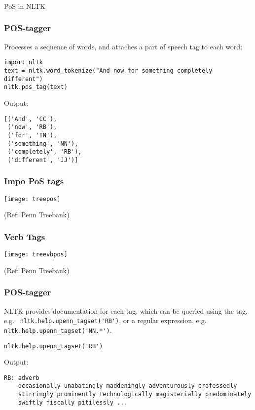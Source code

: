 \begin{frame}[fragile]\frametitle{}

\begin{center}
{\Large PoS in NLTK}
\end{center}
\end{frame}

\begin{frame}[fragile]\frametitle{POS-tagger}
Processes a sequence of words, and attaches a part of speech tag to each word:
\begin{lstlisting}
import nltk
text = nltk.word_tokenize("And now for something completely different")
nltk.pos_tag(text)
\end{lstlisting}
 Output:
\begin{lstlisting}
[('And', 'CC'),
 ('now', 'RB'),
 ('for', 'IN'),
 ('something', 'NN'),
 ('completely', 'RB'),
 ('different', 'JJ')]
\end{lstlisting}
\end{frame}

\begin{frame}[fragile]\frametitle{Impo PoS tags}

\begin{center}
\texttt{[image: treepos]}
\end{center}
  (Ref: Penn Treebank)
\end{frame}

\begin{frame}[fragile]\frametitle{Verb Tags}

\begin{center}
\texttt{[image: treevbpos]}
\end{center}
  (Ref: Penn Treebank)
\end{frame}

\begin{frame}[fragile]\frametitle{POS-tagger}
NLTK provides documentation for each tag, which can be queried using the tag, e.g. \lstinline| nltk.help.upenn_tagset('RB')|, or a regular expression, e.g. \lstinline|nltk.help.upenn_tagset('NN.*')|.
\begin{lstlisting}
nltk.help.upenn_tagset('RB')
\end{lstlisting}
 Output:
\begin{lstlisting}
RB: adverb
    occasionally unabatingly maddeningly adventurously professedly
    stirringly prominently technologically magisterially predominately
    swiftly fiscally pitilessly ...
\end{lstlisting}
\end{frame}

